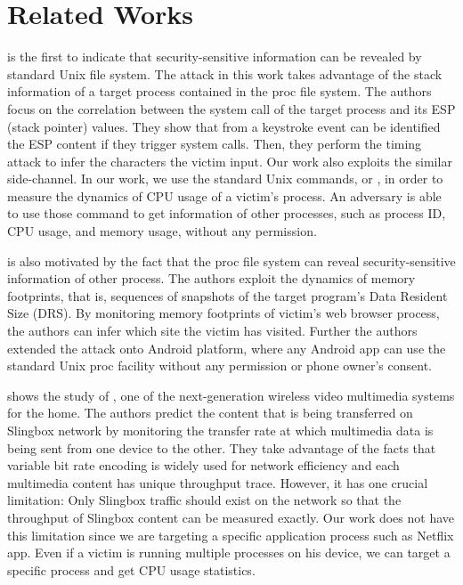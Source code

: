 \section{Related Works}
\label{sec:relatedworks}

\cite{Zhang:2009} is the first to indicate that security-sensitive information can be revealed by standard Unix  file system. 
The attack in this work takes advantage of the stack information of a target process contained in the proc file system. 
The authors focus on the correlation between the system call of the target process and its ESP (stack pointer) values. 
They show that from a keystroke event can be identified the ESP content if they trigger system calls.
Then, they perform the timing attack to infer the characters the victim input. 
Our work also exploits the similar side-channel. 
In our work, we use the standard Unix commands,  or , in order to measure the dynamics of CPU usage of a victim's process. 
An adversary is able to use those command to get information of other processes, such as process ID, CPU usage, and memory usage, without any permission. 

\cite{jana:memento} is also motivated by the fact that the proc file system can reveal security-sensitive information of other process. 
The authors exploit the dynamics of memory footprints, that is, sequences of snapshots of the target program's Data Resident Size (DRS).
By monitoring memory footprints of victim's web browser process, the authors can infer which site the victim has visited. 
Further the authors extended the attack onto Android platform, where any Android app can use the standard Unix proc facility without any permission or phone owner's consent. 

\cite{Saponas07devicesthat} shows the study of \cite{slingbox}, one of the next-generation wireless video multimedia systems for the home. 
The authors predict the content that is being transferred on Slingbox network by monitoring the transfer rate at which multimedia data is being sent from one device to the other. 
They take advantage of the facts that variable bit rate encoding is widely used for network efficiency and each multimedia content has unique throughput trace. 
However, it has one crucial limitation: Only Slingbox traffic should exist on the network so that the throughput of Slingbox content can be measured exactly. 
Our work does not have this limitation since we are targeting a specific application process such as Netflix app.
Even if a victim is running multiple processes on his device, we can target a specific process and get CPU usage statistics. 

